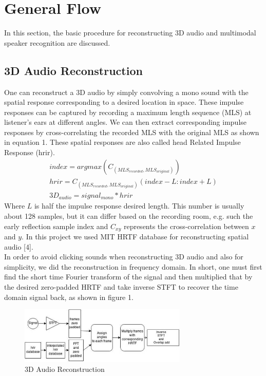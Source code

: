 \documentclass{article}
\begin{document}
\section{General Flow}
\label{ssec:subhead}
In this section, the basic procedure for reconstructing 3D audio and multimodal speaker recognition are discussed.
\subsection{3D Audio Reconstruction}
One can reconstruct a 3D audio by simply convolving a mono sound with the spatial response corresponding to a desired location in space. These impulse responses can be captured by recording a maximum length sequence (MLS) at listener's ears at different angles. We can then extract corresponding impulse responses by cross-correlating the recorded MLS with the original MLS as shown in equation 1. These spatial responses are also called head Related Impulse Response (hrir). 
\begin{subequations}
\begin{gather}
index = argmax({C_{(MLS_{recorded},MLS_{original})}})\\
hrir = C_{(MLS_{recorded},MLS_{original})}(index-L:index+L)\\
3D_{audio} = signal_{mono} * hrir
\end{gather}
\end{subequations}
Where $L$ is half the impulse response desired length. This number is usually about 128 samples, but it can differ based on the recording room, e.g. such the early reflection sample index and $C_{xy}$ represents the cross-correlation between $x$ and $y$. In this project we used MIT HRTF database for reconstructing spatial audio [4]. \\ 

In order to avoid clicking sounds when reconstructing 3D audio and also for simplicity, we did the reconstruction in frequency domain. In short, one must first find the short time Fourier transform of the signal and then multiplied that by the desired zero-padded HRTF and take inverse STFT to recover the time domain signal back, as shown in figure 1. 

\begin{figure}[htb]
\begin{minipage}[b]{0.88\linewidth}
\centering
\centerline{\includegraphics[width=8.0cm]{3d.jpg}}
\end{minipage}
\caption{3D Audio Reconstruction}
\label{fig:res}
\end{figure}
\centerline{}
\end{document}
